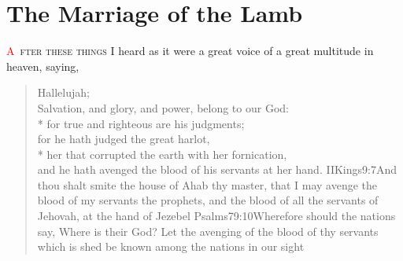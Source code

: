 
\chapter{The Marriage of the Lamb}
\lettrine[lines=3,slope=0.5em]{\textcolor{red}{A}}{\ fter these things} I heard as it were a great voice of a great multitude%
 in heaven, saying,
\zz \begin{verse}
Hallelujah;\\
Salvation, and glory, and power, belong to our God:\\*\vin
{}for true and righteous are his judgments;\\
for he hath judged the great harlot,\\*\vin
her that corrupted the earth with her fornication,\\
and he hath avenged the blood of his servants at her hand.%
				{IIKings}{9:7}{And thou shalt smite the house of Ahab thy master, that I may avenge the blood of my servants the prophets, and the blood of all the servants of Jehovah, at the hand of Jezebel}%
				{Psalms}{79:10}{Wherefore should the nations say, Where is their God? Let the avenging of the blood of thy servants which is shed be known among the nations in our sight}
\end{verse}

